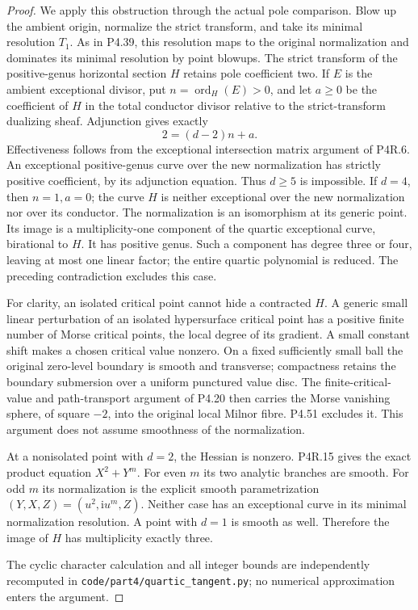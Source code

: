 \begin{proof}
We apply this obstruction through the actual pole
comparison. Blow up the ambient origin, normalize
the strict transform, and take its minimal
resolution $T_1$. As in P4.39, this resolution maps
to the original normalization and dominates its
minimal resolution by point blowups. The strict
transform of the positive-genus horizontal section
$H$ retains pole coefficient two. If $E$ is the
ambient exceptional divisor, put
$n=\operatorname{ord}_H(E)>0$, and let $a\ge0$
be the coefficient of $H$ in the total conductor
divisor relative to the strict-transform dualizing
sheaf. Adjunction gives exactly
\[
                          2=(d-2)n+a.                     \tag{4.52d}
\]
Effectiveness follows from the exceptional
intersection matrix argument of P4R.6. An
exceptional positive-genus curve over the new
normalization has strictly positive coefficient,
by its adjunction equation. Thus $d\ge5$ is
impossible. If $d=4$, then $n=1,a=0$; the curve
$H$ is neither exceptional over the new
normalization nor over its conductor. The
normalization is an isomorphism at its generic
point. Its image is a multiplicity-one component
of the quartic exceptional curve, birational to
$H$. It has positive genus. Such a component has
degree three or four, leaving at most one linear
factor; the entire quartic polynomial is reduced.
The preceding contradiction excludes this case.

For clarity, an isolated critical point cannot
hide a contracted $H$. A generic small linear
perturbation of an isolated hypersurface critical
point has a positive finite number of Morse
critical points, the local degree of its gradient.
A small constant shift makes a chosen critical
value nonzero. On a fixed sufficiently small ball
the original zero-level boundary is smooth and
transverse; compactness retains the boundary
submersion over a uniform punctured value disc.
The finite-critical-value and path-transport
argument of P4.20 then carries the Morse
vanishing sphere, of square $-2$, into the
original local Milnor fibre. P4.51 excludes it.
This argument does not assume smoothness of the
normalization.

At a nonisolated point with $d=2$, the Hessian is
nonzero. P4R.15 gives the exact product equation
$X^2+Y^m$. For even $m$ its two analytic branches
are smooth. For odd $m$ its normalization is the
explicit smooth parametrization
$(Y,X,Z)=(u^2,\mathrm i u^m,Z)$.
Neither case has an exceptional curve in its
minimal normalization resolution. A point with
$d=1$ is smooth as well. Therefore the image of
$H$ has multiplicity exactly three.

The cyclic character calculation and all integer
bounds are independently recomputed in
\texttt{code/part4/quartic\_tangent.py}; no numerical
approximation enters the argument.
\end{proof}
